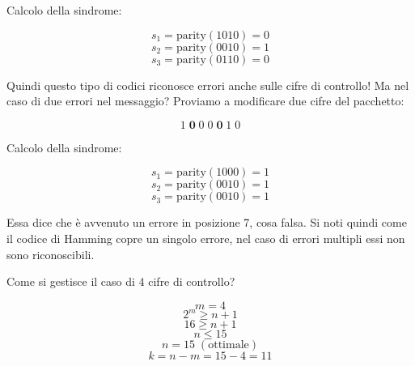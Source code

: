 Calcolo della sindrome:

\begin{equation*}
s_1 = \text{parity}(1010) = 0
\end{equation*}
\begin{equation*}
s_2 = \text{parity}(0010) = 1
\end{equation*}
\begin{equation*}
s_3 = \text{parity}(0110) = 0
\end{equation*}

Quindi questo tipo di codici riconosce errori anche sulle cifre di controllo!
Ma nel caso di due errori nel messaggio? 
Proviamo a modificare due cifre del pacchetto:

\begin{equation*}
1 \; \textbf{0} \; 0 \; 0 \; \textbf{0} \; 1 \; 0
\end{equation*}

Calcolo della sindrome:

\begin{equation*}
s_1 = \text{parity}(1000) = 1
\end{equation*}
\begin{equation*}
s_2 = \text{parity}(0010) = 1
\end{equation*}
\begin{equation*}
s_3 = \text{parity}(0010) = 1
\end{equation*}

Essa dice che è avvenuto un errore in posizione 7, cosa falsa.
Si noti quindi come il codice di Hamming copre un singolo errore, nel caso di errori multipli essi non sono riconoscibili.

\newpage 

Come si gestisce il caso di 4 cifre di controllo?

\begin{equation*}
m=4
\end{equation*}
\begin{equation*}
2^m \geq n+1
\end{equation*}
\begin{equation*}
16 \geq n+1
\end{equation*}
\begin{equation*}
n \leq 15
\end{equation*}
\begin{equation*}
n = 15 \; (\text{ottimale})
\end{equation*}
\begin{equation*}
k=n-m=15-4=11
\end{equation*}

